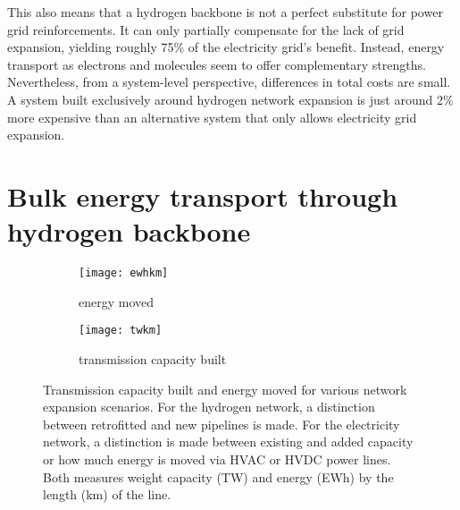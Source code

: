 

This also means that a hydrogen backbone is not a perfect substitute for power
grid reinforcements. It can only partially compensate for the lack of grid
expansion, yielding roughly 75\% of the electricity grid's benefit. Instead,
energy transport as electrons and molecules seem to offer complementary
strengths. Nevertheless, from a system-level perspective, differences in total
costs are small. A system built exclusively around hydrogen network expansion is
just around 2\% more expensive than an alternative system that only allows
electricity grid expansion. %


\section*{Bulk energy transport through hydrogen backbone}
\label{sec:energy-moved}

\begin{figure}
    \centering
        \begin{subfigure}[t]{0.49\textwidth}
            \centering
            \caption{energy moved}
            \texttt{[image: ewhkm]}
            \label{fig:network-stats:ewhkm}
        \end{subfigure}
        \begin{subfigure}[t]{0.49\textwidth}
            \centering
            \caption{transmission capacity built}
            \texttt{[image: twkm]}
            \label{fig:network-stats:twkm}
        \end{subfigure}
    \caption{Transmission capacity built and energy moved for various network
        expansion scenarios. For the hydrogen network, a distinction between
        retrofitted and new pipelines is made. For the electricity network, a
        distinction is made between existing and added capacity or how much
        energy is moved via HVAC or HVDC power lines. Both measures weight
        capacity (TW) and energy (EWh) by the length (km) of the line.}
    \label{fig:network-stats}
\end{figure}

